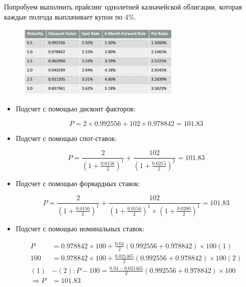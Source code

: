 \documentclass{article}
\begin{document}
Попробуем выполнить прайсинг однолетней казначейской облигации, которая каждые полгода выплачивает купон по 4\%.

\begin{figure}[h]
\centering
\includegraphics[width=0.7\textwidth]{5.png}
\label{loadings}
\end{figure}
\begin{itemize}

    \item Подсчет с помощью дисконт факторов:

    \begin{equation*}
        P = 2\times 0.992556+102\times 0.978842 = 101.83
    \end{equation*}

    \item Подсчет с помощью спот-ставок:

    \begin{equation*}
        P = \frac{2}{(1+\frac{0.0150}{2})^1} + \frac{102}{(1+\frac{0.0215}{2})^2} = 101.83
    \end{equation*}
    
    \item Подсчет с помощью форвардных ставок:

    \begin{equation*}
        P = \frac{2}{(1+\frac{0.0150}{2})^1} + \frac{102}{(1+\frac{0.0150}{2})^1\times(1+\frac{0.0280}{2})^1} = 101.83
    \end{equation*}

    \item Подсчет с помощью номинальных ставок:

    \begin{align*}
        P &= 0.978842\times 100 + \frac{0.04}{2}(0.992556 + 0.978842)\times 100 (1)
        \\
        100 &= 0.978842\times 100 + \frac{0.021465}{2}(0.992556+0.978842)\times 100 (2)
        \\
        (1)&-(2): P - 100 = \frac{0.04 - 0.021465}{2}(0.992556 + 0.978842)\times 100
        \\
        \Rightarrow P &= 101.83
    \end{align*}
\end{itemize}
\end{document}
